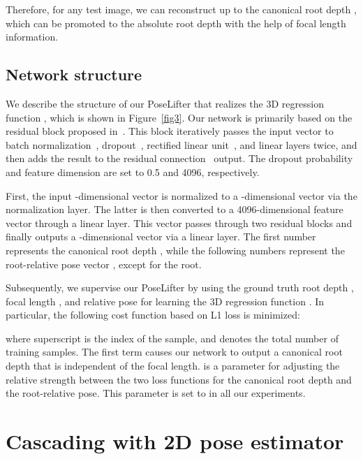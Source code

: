 \documentclass[10pt,twocolumn,letterpaper]{article}
\begin{document}
Therefore, for any test image, we can reconstruct up to the canonical root depth , which can be promoted to the absolute root depth  with the help of focal length information.

\subsection{Network structure}
\label{sec3.2}

We describe the structure of our PoseLifter that realizes the 3D regression function , which is shown in Figure~\ref{fig3}. Our network is primarily based on the residual block proposed in~\cite{Martinez2017}. This block iteratively passes the input vector to batch normalization~\cite{Ioffe2015}, dropout~\cite{Srivastava2014}, rectified linear unit~\cite{Nair2010}, and linear layers twice, and then adds the result to the residual connection~\cite{He2016} output. The dropout probability and feature dimension are set to 0.5 and 4096, respectively.

First, the input -dimensional vector is normalized to a -dimensional vector via the normalization layer. The latter is then converted to a 4096-dimensional feature vector through a linear layer. This vector passes through two residual blocks and finally outputs a -dimensional vector via a linear layer. The first number represents the canonical root depth , while the following  numbers represent the root-relative pose vector , except for the root.

Subsequently, we supervise our PoseLifter by using the ground truth root depth , focal length , and relative pose  for learning the 3D regression function . In particular, the following cost function based on L1 loss is minimized:

where superscript  is the index of the sample, and  denotes the total number of training samples. The first term causes our network to output a canonical root depth that is independent of the focal length.  is a parameter for adjusting the relative strength between the two loss functions for the canonical root depth and the root-relative pose. This parameter is set to  in all our experiments.


\section{Cascading with 2D pose estimator}
\label{sec4}
\end{document}
